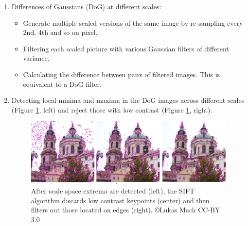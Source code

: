 \begin{enumerate}
\item Differences of Gaussians (DoG) at different scales:
\begin{itemize}
\item Generate multiple scaled versions of the same image by re-sampling every 2nd, 4th and so on pixel.
\item Filtering each scaled picture with various Gaussian filters of different variance.
\item Calculating the difference between pairs of filtered images. This is equivalent to a DoG filter.
\end{itemize}

\item Detecting local minima and maxima in the DoG images across different scales (Figure \ref{fig:siftrejection}, left) and reject those with low contrast (Figure \ref{fig:siftrejection}, right). 

\begin{figure}
	\centering
		\includegraphics[width=\textwidth]{figs/siftrejection.png}
	\caption{After scale space extrema are detected (left), the SIFT algorithm discards low contrast keypoints (center) and then filters out those located on edges (right). \copyright Lukas Mach CC-BY 3.0}
	\label{fig:siftrejection}
\end{figure}


\end{enumerate}
